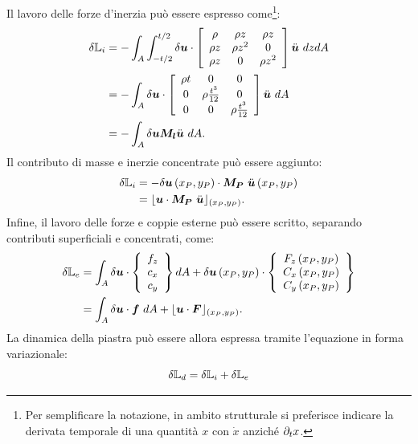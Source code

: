 Il lavoro delle forze d'inerzia può essere espresso come\footnote{Per semplificare la notazione, in ambito strutturale si preferisce indicare la derivata temporale di una quantità $x$ con $\dot{x}$ anziché $\partial_t x$.}:
\begin{align}
\label{eq:7plv8}
\delta\mathbb{L}_i &=-\int_A \int_{-t/2}^{t/2} \delta\boldsymbol{u}
\cdot
\left[
\begin{array}{ccc}
\rho & \rho z & \rho z \\
\rho z & \rho z^2 & 0 \\
\rho z & 0 & \rho z^2
\end{array}
\right]\ddot{\boldsymbol{u}}~dzdA\\
\label{eq:7plv8.1}
& = 
-\int_A \delta\boldsymbol{u}
\cdot
\left[
\begin{array}{ccc}
\rho t & 0 & 0 \\
0 & \rho\frac{t^3}{12} & 0 \\
0 & 0 & \rho \frac{t^3}{12}
\end{array}
\right]\ddot{\boldsymbol{u}}~dA\\
\label{eq:7plv8.2}
 &=- \int_A \delta\boldsymbol{u} \boldsymbol{M_l}\ddot{\boldsymbol{u}}~dA.
\end{align}
Il contributo di masse e inerzie concentrate può essere aggiunto:
\begin{align}
\label{eq:7plv8bis}
\delta\mathbb{L}_i &=-\delta\boldsymbol{u}\left(x_P,y_P\right)
\cdot \boldsymbol{M_P}~\ddot{\boldsymbol{u}}\left(x_P,y_P\right)\\
\label{eq:7plv8bis2}
&= \lfloor\boldsymbol{u}\cdot \boldsymbol{M_P}~\ddot{\boldsymbol{u}} \rfloor_{\left(x_P,y_P\right)}.
\end{align}
Infine, il lavoro delle forze e coppie esterne può essere scritto, separando contributi superficiali e concentrati, come:
\begin{align}
\label{eq:7plv9}
\delta\mathbb{L}_e &=\int_A \delta\boldsymbol{u}
\cdot \left\{\begin{array}{c}f_z\\c_x\\c_y\end{array}\right\}dA 
+ \delta\boldsymbol{u}\left(x_P,y_P\right)
\cdot \left\{\begin{array}{c}F_z\left(x_P,y_P\right)\\C_x\left(x_P,y_P\right)\\C_y\left(x_P,y_P\right)\end{array}\right\}\\
& = 
\int_A \delta\boldsymbol{u}
\cdot
\boldsymbol{f}~dA+\lfloor\boldsymbol{u}\cdot \boldsymbol{F} \rfloor_{\left(x_P,y_P\right)}.
\end{align}
La dinamica della piastra può essere allora espressa tramite l'equazione in forma variazionale:
\begin{equation}
\label{eq:7plv10}
\delta \mathbb{L}_d = \delta \mathbb{L}_i + \delta \mathbb{L}_e
\end{equation}


